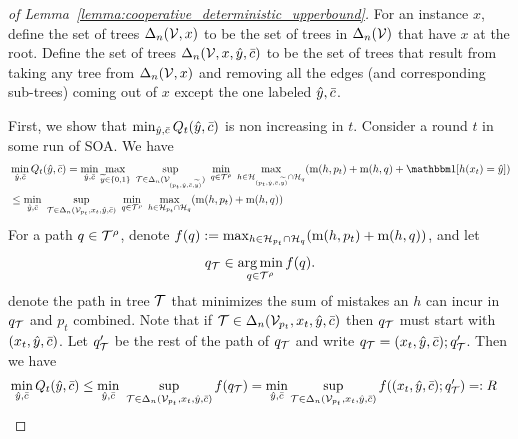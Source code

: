 \documentclass[anon]{alt2027} %
\DeclareMathOperator*{\argmin}{arg\,min}
\begin{document}
\begin{proof}[of Lemma~\ref{lemma:cooperative_deterministic_upperbound}]
For an instance $x$, define the set of trees $\Delta_n({\mathcal V},x)$ to be the set of trees in $\Delta_n({\mathcal V})$ that have $x$ at the root.
Define the set of trees $\Delta_n({\mathcal V},x,{\hat{y}},\bar{c})$ to be the set of trees that result from taking any tree from $\Delta_n({\mathcal V},x)$ and removing all the edges (and corresponding sub-trees) coming out of $x$ except the one labeled ${\hat{y}},\bar{c}$. 

First, we show that $\min_{{\hat{y}},\bar{c}}Q_t({\hat{y}},\bar{c})$ is non increasing in $t$. Consider a round $t$ in some run of SOA. We have
\begin{align*}
  &\min_{\hy,\sc}Q_t(\hy,\sc) = \min_{\hy,\sc} \max_{\vy\in\{0,1\}} ~\sup_{\T\in\Delta_n(\V_{(p_t,\hy, \sc, \vy)})} ~\min_{q\in\T^\rho} ~\max_{h\in \H_{(p_t,\hy, \sc, \vy)}\cap \H_q} (\mi(h, p_t) + \mi(h,q)+\indct[h(x_t) = \hy])\\
  &\leq
    \min_{\hy,\sc}  ~\sup_{\T\in\Delta_n(\V_{p_t},x_t,\hy,\sc)} ~\min_{q\in\T^\rho} ~\max_{h\in \H_{p_t}\cap \H_q} (\mi(h, p_t) + \mi(h,q))
\end{align*}
For a path $q\in{\mathcal T}^\rho$, denote $f(q) := \max_{h\in {{\mathcal H}}_{p_t}\cap {{\mathcal H}}_q} (\mathrm{m}(h, p_t) + \mathrm{m}(h,q))$, and let
\[
q_\T \in \argmin_{q\in\T^\rho} f(q).
\]
denote the path in tree ${\mathcal T}$ that minimizes the sum of mistakes an $h$ can incur in $q_{\mathcal T}$ and $p_t$ combined.
Note that if ${\mathcal T} \in \Delta_n({\mathcal V}_{p_t},x_t,{\hat{y}},\bar{c})$ then $q_{\mathcal T}$ must start with $(x_t,{\hat{y}},\bar{c})$. Let $q'_{\mathcal T}$ be the rest of the path of $q_{\mathcal T}$ and write $q_{\mathcal T} = (x_t,{\hat{y}},\bar{c});q'_{\mathcal T}$. 
Then we have 
\begin{align*}
&\min_{{\hat{y}},\bar{c}}Q_t({\hat{y}},\bar{c})  \leq \min_{{\hat{y}},\bar{c}}  ~\sup_{{\mathcal T}\in\Delta_n({\mathcal V}_{p_t},x_t,{\hat{y}},\bar{c})} f(q_{\mathcal T}) = 
\min_{{\hat{y}},\bar{c}}\sup_{{\mathcal T}\in\Delta_n({\mathcal V}_{p_t},x_t,{\hat{y}},\bar{c})} f((x_t,{\hat{y}},\bar{c});q'_{\mathcal T}) =: R
\end{align*}


\end{proof}
\end{document}
